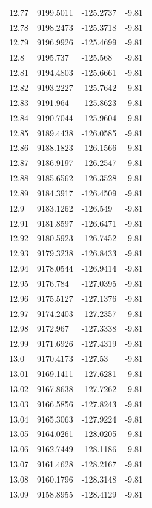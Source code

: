 \begin{table}[H]
\begin{tabular}{llll}
12.77 & 9199.5011 & -125.2737 & -9.81 \\
12.78 & 9198.2473 & -125.3718 & -9.81 \\
12.79 & 9196.9926 & -125.4699 & -9.81 \\
12.8 & 9195.737 & -125.568 & -9.81 \\
12.81 & 9194.4803 & -125.6661 & -9.81 \\
12.82 & 9193.2227 & -125.7642 & -9.81 \\
12.83 & 9191.964 & -125.8623 & -9.81 \\
12.84 & 9190.7044 & -125.9604 & -9.81 \\
12.85 & 9189.4438 & -126.0585 & -9.81 \\
12.86 & 9188.1823 & -126.1566 & -9.81 \\
12.87 & 9186.9197 & -126.2547 & -9.81 \\
12.88 & 9185.6562 & -126.3528 & -9.81 \\
12.89 & 9184.3917 & -126.4509 & -9.81 \\
12.9 & 9183.1262 & -126.549 & -9.81 \\
12.91 & 9181.8597 & -126.6471 & -9.81 \\
12.92 & 9180.5923 & -126.7452 & -9.81 \\
12.93 & 9179.3238 & -126.8433 & -9.81 \\
12.94 & 9178.0544 & -126.9414 & -9.81 \\
12.95 & 9176.784 & -127.0395 & -9.81 \\
12.96 & 9175.5127 & -127.1376 & -9.81 \\
12.97 & 9174.2403 & -127.2357 & -9.81 \\
12.98 & 9172.967 & -127.3338 & -9.81 \\
12.99 & 9171.6926 & -127.4319 & -9.81 \\
13.0 & 9170.4173 & -127.53 & -9.81 \\
13.01 & 9169.1411 & -127.6281 & -9.81 \\
13.02 & 9167.8638 & -127.7262 & -9.81 \\
13.03 & 9166.5856 & -127.8243 & -9.81 \\
13.04 & 9165.3063 & -127.9224 & -9.81 \\
13.05 & 9164.0261 & -128.0205 & -9.81 \\
13.06 & 9162.7449 & -128.1186 & -9.81 \\
13.07 & 9161.4628 & -128.2167 & -9.81 \\
13.08 & 9160.1796 & -128.3148 & -9.81 \\
13.09 & 9158.8955 & -128.4129 & -9.81 \\

\end{tabular}
\end{table}
